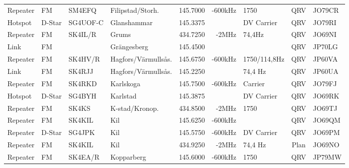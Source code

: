 \documentclass[10pt,swedish,a4paper,twoside]{article}
\begin{document}
\begin{landscape}
\begin{longtable}{llllrrlcl}
	Repeater          & FM           & SM4EFQ        & Filipstad/Storh.    &          145.7000 &        -600kHz & 1750            &       QRV       & JO79CR           \\
	Hotspot           & D-Star       & SG4UOF-C      & Glanshammar         &          145.3375 &                & DV Carrier      &       QRV       & JO79RI           \\
	Repeater          & FM           & SK4IL/R       & Grums               &          434.7250 &          -2MHz & 74,4Hz          &       QRV       & JO69NI           \\
	Link              & FM           &               & Grängesberg         &          145.4500 &                &                 &       QRV       & JP70LG           \\
	Repeater          & FM           & SK4HV/R       & Hagfors/Värmullsås. &          145.6750 &        -600kHz & 1750/114,8Hz    &       QRV       & JP60VA           \\
	Link              & FM           & SK4RJJ        & Hagfors/Värmullsås. &          145.2250 &                & 74,4 Hz         &       QRV       & JP60UA           \\
	Repeater          & FM           & SK4RKD        & Karlskoga           &          145.7500 &        -600kHz & Carrier         &       QRV       & JO79FJ           \\
	Hotspot           & D-Star       & SG4BYH        & Karlstad            &          145.3875 &                & DV Carrier      &       QRV       & JO69RK           \\
	Repeater          & FM           & SK4KS         & K-stad/Kronop.      &          434.8500 &          -2MHz & 1750            &       QRV       & JO69TJ           \\
	Repeater          & FM           & SK4KIL        & Kil                 &          145.6250 &        -600kHz &                 &       QRV       & JO69QM           \\
	Repeater          & D-Star       & SG4JPK        & Kil                 &          145.5750 &        -600kHz & DV Carrier      &       QRV       & JO69PM           \\
	Repeater          & FM           & SK4KIL        & Kil                 &          434.9250 &          -2MHz & 74,4 Hz         &      Plan       & JO69NO           \\
	Repeater          & FM           & SK4EA/R       & Kopparberg          &          145.6000 &        -600kHz & 1750            &       QRV       & JP79MW           \\

\end{longtable}
\end{landscape}
\end{document}
